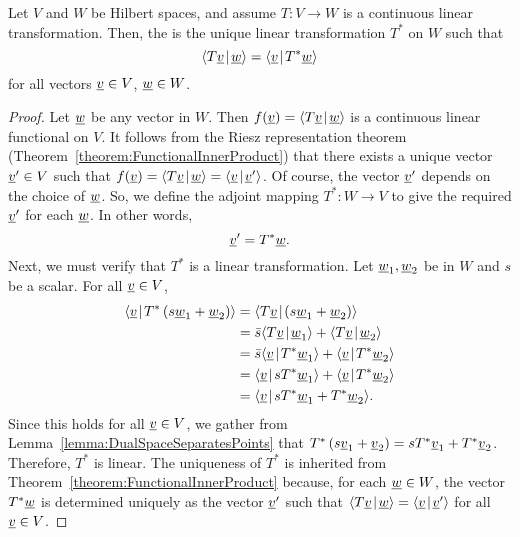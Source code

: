 \begin{theorem}
Let $V$ and $W$ be Hilbert spaces, and assume $T \colon V \rightarrow W$ is a continuous linear transformation.
Then, the  is the unique linear transformation $T^*$ on $W$ such that
\begin{equation*}
{\left\langle  T \underline{v}  \mskip2mu \middle| \mskip2mu  \underline{w}  \right\rangle}
= {\left\langle  \underline{v}  \mskip2mu \middle| \mskip2mu  T^* \underline{w}  \right\rangle}
\end{equation*}
for all vectors $\underline{v} \in V$, $\underline{w} \in W$.
\end{theorem}
\begin{proof}
Let $\underline{w}$ be any vector in $W$.
Then $f(\underline{v}) = {\left\langle  T \underline{v}  \mskip2mu \middle| \mskip2mu  \underline{w}  \right\rangle}$ is a continuous linear functional on $V$.
It follows from the Riesz representation theorem (Theorem~\ref{theorem:FunctionalInnerProduct}) that there exists a unique vector $\underline{v}' \in V$ such that $f(\underline{v}) = {\left\langle  T \underline{v}  \mskip2mu \middle| \mskip2mu  \underline{w}  \right\rangle} = {\left\langle  \underline{v}  \mskip2mu \middle| \mskip2mu  \underline{v}'  \right\rangle}$.
Of course, the vector $\underline{v}'$ depends on the choice of $\underline{w}$.
So, we define the adjoint mapping $T^* \colon W \rightarrow V$ to give the required $\underline{v}'$ for each $\underline{w}$.
In other words,
\begin{equation*}
\underline{v}' = T^* \underline{w} .
\end{equation*}
Next, we must verify that $T^*$ is a linear transformation.
Let $\underline{w}_1, \underline{w}_2$ be in $W$ and $s$ be a scalar.
For all $\underline{v} \in V$,
\begin{equation*}
\begin{split}
{\left\langle  \underline{v}  \mskip2mu \middle| \mskip2mu  T^* \left( s \underline{w}_1 + \underline{w}_2 \right)  \right\rangle}
&= {\left\langle  T \underline{v}  \mskip2mu \middle| \mskip2mu  \left( s \underline{w}_1 + \underline{w}_2 \right)  \right\rangle} \\
&= \bar{s} {\left\langle  T \underline{v}  \mskip2mu \middle| \mskip2mu  \underline{w}_1  \right\rangle}
+ {\left\langle  T \underline{v}  \mskip2mu \middle| \mskip2mu  \underline{w}_2  \right\rangle} \\
&= \bar{s} {\left\langle  \underline{v}  \mskip2mu \middle| \mskip2mu  T^* \underline{w}_1  \right\rangle}
+ {\left\langle  \underline{v}  \mskip2mu \middle| \mskip2mu  T^* \underline{w}_2  \right\rangle} \\
&= {\left\langle  \underline{v}  \mskip2mu \middle| \mskip2mu  s T^* \underline{w}_1  \right\rangle}
+ {\left\langle  \underline{v}  \mskip2mu \middle| \mskip2mu  T^* \underline{w}_2  \right\rangle} \\
&= {\left\langle  \underline{v}  \mskip2mu \middle| \mskip2mu  s T^* \underline{w}_1 + T^* \underline{w}_2  \right\rangle} .
\end{split}
\end{equation*}
Since this holds for all $\underline{v} \in V$, we gather from Lemma~\ref{lemma:DualSpaceSeparatesPoints} that $T^* \left( s \underline{v}_1 + \underline{v}_2 \right) = s T^* \underline{v}_1 + T^* \underline{v}_2$.
Therefore, $T^*$ is linear.
The uniqueness of $T^*$ is inherited from Theorem~\ref{theorem:FunctionalInnerProduct} because, for each $\underline{w}\in W$, the vector $T^* \underline{w}$ is determined uniquely as the vector $\underline{v}'$ such that ${\left\langle  T \underline{v}  \mskip2mu \middle| \mskip2mu  \underline{w}  \right\rangle} = {\left\langle  \underline{v}  \mskip2mu \middle| \mskip2mu  \underline{v}'  \right\rangle}$ for all $\underline{v} \in V$.
\end{proof}

